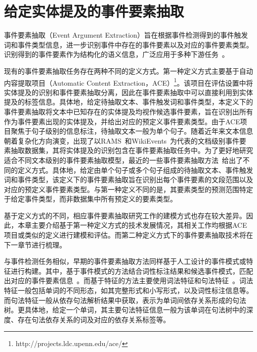 \section{给定实体提及的事件要素抽取}
\label{section2_2}
事件要素抽取（Event Argument Extraction）旨在根据事件检测得到的事件触发词和事件类型信息，进一步识别事件中存在的事件要素以及对应的事件要素类型。识别得到的事件要素作为结构化的语义信息，广泛应用于多种下游任务~\cite{wen2021resin,wu2022cross,fung2023deepmaven,liu2023covid}。

现有的事件要素抽取任务存在两种不同的定义方式。第一种定义方式主要基于自动内容提取项目（Automatic Content Extraction，ACE）\footnote{http://projects.ldc.upenn.edu/ace/}。该项目在评估设置中将实体提及的识别和事件要素抽取分离，因此在事件要素抽取中可以直接利用到实体提及的标签信息。具体地，给定待抽取文本、事件触发词和事件类型，本定义下的事件要素抽取将文本中已知存在的实体提及均视作候选事件要素，旨在识别出所有作为事件要素出现的实体提及，并给出对应的预定义事件要素类型。由于ACE项目聚焦于句子级别的信息标注，待抽取文本一般为单个句子。随着近年来文本信息朝着复杂化方向演变，出现了以RAMS~\cite{ebner2020multi}和WikiEvents~\cite{li2021document}为代表的文档级别事件要素抽取数据集，其将实体提及的识别包含在事件要素抽取任务中。为了更好地研究适合不同文本级别的事件要素抽取模型，最近的一些事件要素抽取方法~\cite{ma2022prompt}给出了不同的定义方式。具体地，给定由单个句子或多个句子组成的待抽取文本、事件触发词和事件类型，该定义下的事件要素抽取旨在识别出每个事件要素的文段范围以及对应的预定义事件要素类型。与第一种定义不同的是，其要素类型的预测范围特定于给定事件类型，而非数据集中所有预定义的要素类型。

基于定义方式的不同，相应事件要素抽取研究工作的建模方式也存在较大差异。因此，本章主要介绍基于第一种定义方式的技术发展情况，其相关工作均根据ACE项目或类似的定义进行建模和评估。而第二种定义方式下的事件要素抽取技术将在下一章节进行梳理。

与事件检测任务相似，早期的事件要素抽取方法同样基于人工设计的事件模式或特征进行构建。其中，基于事件模式的方法结合词性标注结果和候选事件模式，匹配出对应的事件要素信息~\cite{cao2018including}。而基于特征的方法主要使用词法特征和句法特征~\cite{li2013joint}。词法特征一般包括单词的不同形态，如其完整形式和小写形式，以及词性标注信息等。而句法特征一般从依存句法解析结果中获取，表示为单词间依存关系形成的句法树。更具体地，给定一个单词，其主要句法特征信息一般为该单词在句法树中的深度、存在句法依存关系的词及对应的依存关系标签等。

